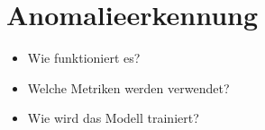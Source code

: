 \section{Anomalieerkennung}
\begin{itemize}
    \item Wie funktioniert es?
    \item Welche Metriken werden verwendet?
    \item Wie wird das Modell trainiert?
\end{itemize}